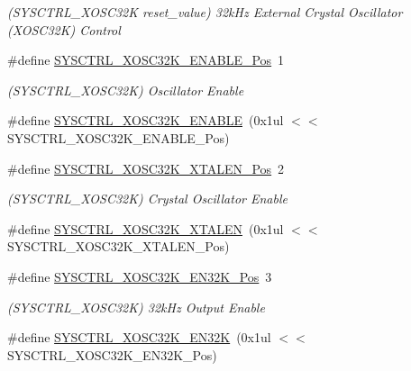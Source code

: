 \begin{DoxyCompactItemize}
\begin{DoxyCompactList}\small\item\em (S\+Y\+S\+C\+T\+R\+L\+\_\+\+X\+O\+S\+C32K reset\+\_\+value) 32k\+Hz External Crystal Oscillator (X\+O\+S\+C32K) Control \end{DoxyCompactList}\item 
\#define \mbox{\hyperlink{group___s_a_m_d21___s_y_s_c_t_r_l_ga024f7356b911c405710f9725eb356994}{S\+Y\+S\+C\+T\+R\+L\+\_\+\+X\+O\+S\+C32\+K\+\_\+\+E\+N\+A\+B\+L\+E\+\_\+\+Pos}}~1
\begin{DoxyCompactList}\small\item\em (S\+Y\+S\+C\+T\+R\+L\+\_\+\+X\+O\+S\+C32K) Oscillator Enable \end{DoxyCompactList}\item 
\#define \mbox{\hyperlink{group___s_a_m_d21___s_y_s_c_t_r_l_ga4950c5c4f56e795c2bf41496827bc566}{S\+Y\+S\+C\+T\+R\+L\+\_\+\+X\+O\+S\+C32\+K\+\_\+\+E\+N\+A\+B\+LE}}~(0x1ul $<$$<$ S\+Y\+S\+C\+T\+R\+L\+\_\+\+X\+O\+S\+C32\+K\+\_\+\+E\+N\+A\+B\+L\+E\+\_\+\+Pos)
\item 
\#define \mbox{\hyperlink{group___s_a_m_d21___s_y_s_c_t_r_l_gadf4d3ac9b202cacf34e49b52c1c6f03d}{S\+Y\+S\+C\+T\+R\+L\+\_\+\+X\+O\+S\+C32\+K\+\_\+\+X\+T\+A\+L\+E\+N\+\_\+\+Pos}}~2
\begin{DoxyCompactList}\small\item\em (S\+Y\+S\+C\+T\+R\+L\+\_\+\+X\+O\+S\+C32K) Crystal Oscillator Enable \end{DoxyCompactList}\item 
\#define \mbox{\hyperlink{group___s_a_m_d21___s_y_s_c_t_r_l_gad6de3c7bb7a45f045afe23234d3e0ef5}{S\+Y\+S\+C\+T\+R\+L\+\_\+\+X\+O\+S\+C32\+K\+\_\+\+X\+T\+A\+L\+EN}}~(0x1ul $<$$<$ S\+Y\+S\+C\+T\+R\+L\+\_\+\+X\+O\+S\+C32\+K\+\_\+\+X\+T\+A\+L\+E\+N\+\_\+\+Pos)
\item 
\#define \mbox{\hyperlink{group___s_a_m_d21___s_y_s_c_t_r_l_ga7ba19dadbed3c2388e4303ce1bfcace9}{S\+Y\+S\+C\+T\+R\+L\+\_\+\+X\+O\+S\+C32\+K\+\_\+\+E\+N32\+K\+\_\+\+Pos}}~3
\begin{DoxyCompactList}\small\item\em (S\+Y\+S\+C\+T\+R\+L\+\_\+\+X\+O\+S\+C32K) 32k\+Hz Output Enable \end{DoxyCompactList}\item 
\#define \mbox{\hyperlink{group___s_a_m_d21___s_y_s_c_t_r_l_gac04fd3a138764ab107557cfb769ac349}{S\+Y\+S\+C\+T\+R\+L\+\_\+\+X\+O\+S\+C32\+K\+\_\+\+E\+N32K}}~(0x1ul $<$$<$ S\+Y\+S\+C\+T\+R\+L\+\_\+\+X\+O\+S\+C32\+K\+\_\+\+E\+N32\+K\+\_\+\+Pos)
\item 
$$
\end{DoxyCompactItemize}
